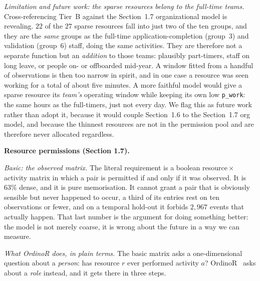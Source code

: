 \emph{Limitation and future work: the sparse resources belong to the full-time
teams.} Cross-referencing Tier~B against the Section~1.7 organizational model
is revealing. $22$ of the $27$ sparse resources fall into just two of the ten
groups, and they are the \emph{same} groups as the full-time
application-completion (group~3) and validation (group~6) staff, doing the same
activities. They are therefore not a separate function but an \emph{addition}
to those teams: plausibly part-timers, staff on long leave, or people on- or
offboarded mid-year. A window fitted from a handful of observations is then too
narrow in spirit, and in one case a resource was seen working for a total of
about five minutes. A more faithful model would give a sparse resource its
\emph{team's} operating window while keeping its own low \texttt{p\_work}: the
same hours as the full-timers, just not every day. We flag this as future work
rather than adopt it, because it would couple Section~1.6 to the Section~1.7
org model, and because the thinnest resources are not in the permission pool
and are therefore never allocated regardless.


\textbf{Resource permissions (Section 1.7).}

\emph{Basic: the observed matrix.} The literal requirement is a boolean
resource\,$\times$\,activity matrix in which a pair is permitted if and only if
it was observed. It is $63\%$ dense, and it is pure memorisation. It cannot
grant a pair that is obviously sensible but never happened to occur, a third of
its entries rest on ten observations or fewer, and on a temporal hold-out it
forbids $2{,}967$ events that actually happen. That last number is the argument
for doing something better: the model is not merely coarse, it is wrong about
the future in a way we can measure.

\emph{What OrdinoR does, in plain terms.} The basic matrix asks a
one-dimensional question about a \emph{person}: has resource $r$ ever performed
activity $a$? OrdinoR~\cite{yang2022ordinor} asks about a \emph{role} instead,
and it gets there in three steps.

